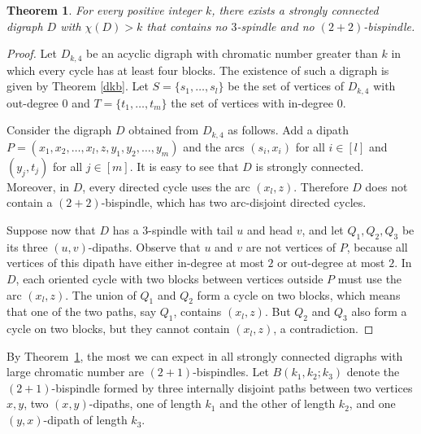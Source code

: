 \documentclass[utf8,10pt]{article}
\theoremstyle{plain}
\newtheorem{theorem}{Theorem}
\theoremstyle{definition}
\theoremstyle{remark}
\begin{document}
\begin{theorem}\label{thm:no}
For every positive integer $k$, there exists a strongly connected digraph $D$ with $\chi(D) >k$ that contains no $3$-spindle and no $(2+2)$-bispindle. 
\end{theorem}

\begin{proof}
Let $D_{k,4}$ be an acyclic digraph with chromatic number greater than $k$ in which every cycle has at least four blocks. The existence of such a digraph is given by Theorem \ref{dkb}.
Let $S = \{s_1, \dots,  s_l\}$ be the set of vertices of $D_{k,4}$ with out-degree 0 and $T = \{t_1, \dots, t_m\}$ the set of vertices with in-degree 0.

Consider the digraph $D$ obtained from $D_{k,4}$ as follows. Add a dipath  $P = (x_1,x_2, \dots , x_l,z,y_1,y_2,\dots, y_m)$ and the arcs $(s_i,x_i)$ for all $i\in [l]$ and
$(y_j,t_j)$ for all $j\in [m]$. It is easy to see that $D$ is strongly connected.
Moreover, in $D$, every directed cycle uses the arc $(x_l,z)$. Therefore $D$ does not contain a $(2+2)$-bispindle, which has two arc-disjoint directed cycles. 

Suppose now that $D$ has a $3$-spindle with tail $u$ and head $v$, and let $Q_1, Q_2, Q_3$ be its three $(u,v)$-dipaths. Observe that $u$ and $v$ are not vertices of $P$, because all vertices of this dipath have either in-degree at most $2$ or out-degree at most $2$. In $D$, each oriented cycle with two blocks between vertices outside $P$ must use the arc $(x_l,z)$. The union of $Q_1$ and $Q_2$ form a cycle on two blocks, 
which means that one of the two paths, say $Q_1$, contains $(x_l,z)$. But $Q_2$ and $Q_3$ also form a cycle on two blocks, but they cannot contain $(x_l,z)$, a contradiction.
\end{proof}





By Theorem~\ref{thm:no}, the most we can expect in all strongly connected digraphs with large chromatic number are $(2+1)$-bispindles.
Let $B(k_1,k_2;k_3)$ denote the $(2+1)$-bispindle formed by three internally disjoint paths between two vertices $x,y$,
two $(x,y)$-dipaths, one of length $k_1$ and the other of length $k_2$, and one $(y,x)$-dipath of length $k_3$.
\end{document}
